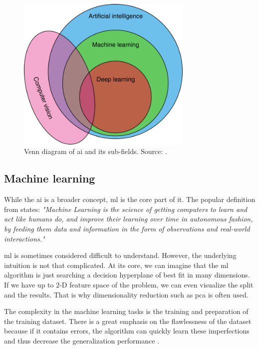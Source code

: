         \begin{figure}[ht]
            \centering
            \includegraphics[width=0.75\textwidth]{resources/artificial_intelligence_set.png}
            \caption{Venn diagram of \gls{ai} and its sub-fields. Source: \cite{ruffle2018artificial}.}
            \label{fig:image_classification}
        \end{figure}
    
    \subsection{Machine learning}
        While the \gls{ai} is a broader concept, \gls{ml} is the core part of it. The popular definition from \cite{faggellaml} states: \textit{"Machine Learning is the science of getting computers to learn and act like humans do, and improve their learning over time in autonomous fashion, by feeding them data and information in the form of observations and real-world interactions."}
        
        \Gls{ml} is sometimes considered difficult to understand. However, the underlying intuition is not that complicated. At its core, we can imagine that the \gls{ml} algorithm is just searching a decision hyperplane of best fit in many dimensions. If we have up to 2-D feature space of the problem, we can even visualize the split and the results. That is why dimensionality reduction such as \gls{pca} \cite{pearson1901liii} is often used.
        
        The complexity in the machine learning tasks is the training and preparation of the training dataset. There is a great emphasis on the flawlessness of the dataset because if it contains errors, the algorithm can quickly learn these imperfections and thus decrease the generalization performance \cite{bishop2006pattern}. 
        
